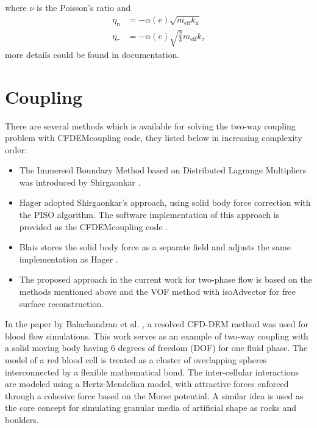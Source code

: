 where $\nu$ is the Poisson’s ratio and 
\begin{equation}
\begin{aligned}
 \eta_{\mathrm{n}} &= -\alpha(e) \sqrt{m_{\mathrm{eff}} k_{\mathrm{n}}} \\
 \eta_{\tau} &= -\alpha(e) \sqrt{\frac{2}{3}} m_{\mathrm{eff}} k_{\tau}
\end{aligned}
\end{equation}
more details could be found in \cite{LIGGGHTS} documentation.

\section{Coupling}
There are several methods which is available for solving the two-way coupling problem with CFDEMcoupling code, they listed below in increasing complexity order:
\begin{itemize}
\item The Immersed Boundary Method based on Distributed Lagrange Multipliers \cite{glowinski1999distributed} was introduced by Shirgaonkar \cite{shirgaonkar2009new}.
\item Hager \cite{hager2014cfd} adopted Shirgaonkar's approach, using solid body force correction with the PISO algorithm. The software implementation of this approach is provided as the CFDEMcoupling code \cite{kloss2012models}.
\item Blais \cite{blais2016semi} stores the solid body force as a separate field and adjusts the same implementation as Hager \cite{kloss2012models}.
\item The proposed approach in the current work for two-phase flow is based on the methods mentioned above and the VOF method with isoAdvector for free surface reconstruction.
\end{itemize}

In the paper by Balachandran et al. \cite{balachandran2021resolved}, a resolved CFD-DEM method was used for blood flow simulations. This work serves as an example of two-way coupling with a solid moving body having 6 degrees of freedom (DOF) for one fluid phase. The model of a red blood cell is treated as a cluster of overlapping spheres interconnected by a flexible mathematical bond. The inter-cellular interactions are modeled using a Hertz-Mendelian model, with attractive forces enforced through a cohesive force based on the Morse potential. A similar idea is used as the core concept for simulating granular media of artificial shape as rocks and boulders.

